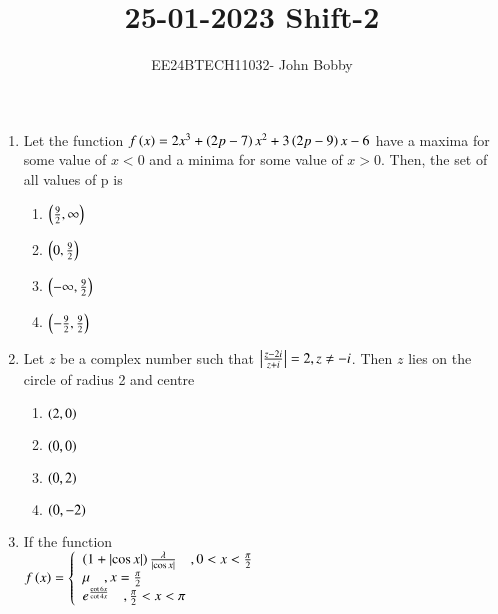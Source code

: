 \documentclass[journal,12pt,onecolumn]{IEEEtran}
\theoremstyle{remark}
\begin{document}

\vspace{3cm}

\title{\textbf{25-01-2023 Shift-2}}
\author{EE24BTECH11032- John Bobby}
\maketitle
\bigskip

\renewcommand{\thefigure}{\theenumi}
\renewcommand{\thetable}{\theenumi}
\setlength{\columnsep}{2.5em}
\begin{enumerate}
    \item Let the function $f\left(x\right)=2x^3+\left(2p-7\right)x^2+3\left(2p-9\right)x-6$ have a maxima for some value of $x<0$ and a minima for some value of $x>0$. Then, the set of all values of p is
    \begin{enumerate}
        \item $\left(\frac{9}{2},\infty\right)$
        \item $\left(0,\frac{9}{2}\right)$
        \item $\left(-\infty,\frac{9}{2}\right)$
        \item $\left(-\frac{9}{2},\frac{9}{2}\right)$
    \end{enumerate}
    \item Let $z$ be a complex number such that $\left\vert\frac{z-2i}{z+i}\right\vert=2,z\neq-i$. Then $z$ lies on the circle of radius 2 and centre
    \begin{enumerate}
        \item $\left(2,0\right)$
        \item $\left(0,0\right)$
        \item $\left(0,2\right)$
        \item $\left(0,-2\right)$
    \end{enumerate}
    \item If the function \\
    $f\left(x\right)=\left\{ \begin{array}{ll} \left(1+\left\vert\cos{x}\right\vert\right)\frac{\lambda}{\left\vert\cos{x}\right\vert} \quad ,0<x < \frac{\pi}{2} \\ \mu \quad, x=\frac{\pi}{2} \\ e^{\frac{\cot6x}{\cot4x}} \quad ,\frac{\pi}{2}<x<\pi \end{array} \right. $\\

\end{enumerate}
\end{document}
